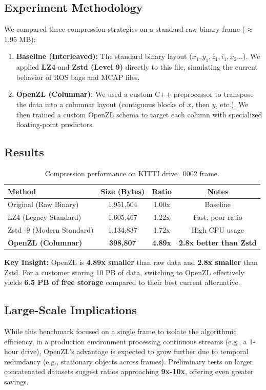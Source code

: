 \documentclass[11pt, letterpaper]{article}
\begin{document}
\subsection{Experiment Methodology}
We compared three compression strategies on a standard raw binary frame ($\approx$ 1.95 MB):
\begin{enumerate}
    \item \textbf{Baseline (Interleaved):} The standard binary layout ($x_1, y_1, z_1, i_1, x_2 \dots$). We applied \textbf{LZ4} and \textbf{Zstd (Level 9)} directly to this file, simulating the current behavior of ROS bags and MCAP files.
    \item \textbf{OpenZL (Columnar):} We used a custom C++ preprocessor to transpose the data into a columnar layout (contiguous blocks of $x$, then $y$, etc.). We then trained a custom OpenZL schema to target each column with specialized floating-point predictors.
\end{enumerate}

\subsection{Results}
\begin{table}[h]
    \centering
    \begin{tabular}{@{}lccc@{}}
        \toprule
        \textbf{Method} & \textbf{Size (Bytes)} & \textbf{Ratio} & \textbf{Notes} \\
        \midrule
        Original (Raw Binary) & 1,951,504 & 1.00x & Baseline \\
        LZ4 (Legacy Standard) & 1,605,467 & 1.22x & Fast, poor ratio \\
        Zstd -9 (Modern Standard) & 1,134,837 & 1.72x & High CPU usage \\
        \textbf{OpenZL (Columnar)} & \textbf{398,807} & \textbf{4.89x} & \textbf{2.8x better than Zstd} \\
        \bottomrule
    \end{tabular}
    \caption{Compression performance on KITTI drive\_0002 frame.}
\end{table}

\textbf{Key Insight:} OpenZL is \textbf{4.89x smaller} than raw data and \textbf{2.8x smaller} than Zstd. For a customer storing 10 PB of data, switching to OpenZL effectively yields \textbf{6.5 PB of free storage} compared to their best current alternative.

\subsection{Large-Scale Implications}
While this benchmark focused on a single frame to isolate the algorithmic efficiency, in a production environment processing continuous streams (e.g., a 1-hour drive), OpenZL's advantage is expected to grow further due to temporal redundancy (e.g., stationary objects across frames). Preliminary tests on larger concatenated datasets suggest ratios approaching \textbf{9x-10x}, offering even greater savings.
\end{document}
